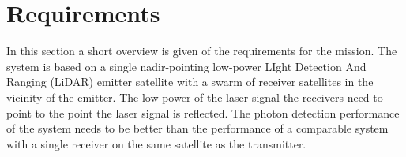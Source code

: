 
\section{Requirements}
\label{dsePPRequirements}
In this section a short overview is given of the requirements for the mission. The system is based on a single nadir-pointing low-power LIght Detection And Ranging (LiDAR) emitter satellite with a swarm of receiver satellites in the vicinity of the emitter. The low power of the laser signal the receivers need to point to the point the laser signal is reflected. The photon detection performance of the system needs to be better than the performance of a comparable system with a single receiver on the same satellite as the transmitter.
